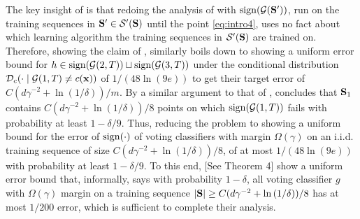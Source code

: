 The key insight of \citeauthor{Optimalweaktostronglearning} is that redoing the analysis of \cite{hannekeoptimal} with $\operatorname{sign}(\mathcal{G}(\mathbf{S}'))$, run on the training sequences in $\mathbf{S}'\in \mathcal{S}'(\mathbf{S})$ until the point \cref{eq:intro4}, uses no fact about which learning algorithm the training sequences in $\mathcal{S}'(\mathbf{S})$ are trained on. Therefore, showing the claim of \citeauthor{Optimalweaktostronglearning}, similarly boils down to showing a uniform error bound for $h\in \operatorname{sign}(\mathcal{G}(2,T))\sqcup\operatorname{sign}(\mathcal{G}(3,T))$ under the conditional distribution $ \mathcal{D}_{c}(\cdot\mid \mathcal{G}(1,T)\not=c(\mathbf{x})) $ of  $1/(48\ln{\left(9e \right)})$ to get their target error of $C(d\gamma^{-2}+\ln{\left(1/\delta \right)})/m$. By a similar argument to that of \cite{hannekeoptimal}, \citeauthor{Optimalweaktostronglearning} concludes that $\mathbf{S}_{1}$ contains $C(d\gamma^{-2}+\ln{\left(1/\delta \right)})/8$ points on which $\operatorname{sign}(\mathcal{G}(1,T))$ fails with probability at least $ 1-\delta/9 $. Thus, reducing the problem to showing a uniform bound for the error of $ \operatorname{sign}(\cdot) $ of voting classifiers with margin $\Omega(\gamma)$ on an i.i.d. training sequence of size $C(d\gamma^{-2}+\ln{\left(1/\delta \right)})/8$, of at most $1/(48\ln{\left(9e \right)})$ with probability at least $1-\delta/9$. To this end, \citeauthor{Optimalweaktostronglearning}[See Theorem 4] show a uniform error bound that, informally, says with probability $1-\delta$, all voting classifier $ g $  with $\Omega(\gamma)$ margin on a training sequence $|\mathbf{S}|\geq C(d\gamma^{-2}+\ln{\left(1/\delta \right)})/8$ has at most 
 $ 1/200 $ error, which is sufficient to complete their analysis. 

